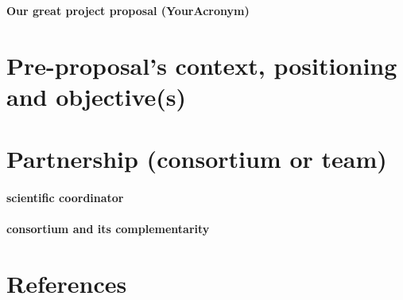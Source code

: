 \documentclass[a4paper,11pt,english]{article}
\newcommand{\acronym}{YourAcronym}
\begin{document}
\begin{center}
    {\Large\bf Our great project proposal (\acronym)}
\end{center}

\section{Pre-proposal’s context, positioning and objective(s)}




\section{Partnership (consortium or team)}

\paragraph{scientific coordinator}

\paragraph{consortium and its complementarity}

\section{References}
\end{document}
